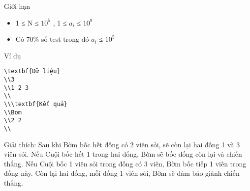 Giới hạn
\begin{itemize}
	\item     1 ≤ N ≤ $10^{5}$    , 1 ≤ $a_{i}$    ≤ $10^{9}$
	\item     Có 70\% số test trong đó $a_{i}$    ≤ $10^{5}$
\end{itemize}
Ví dụ
\begin{verbatim}
\textbf{Dữ liệu}
\\3
\\1 2 3 
\\
\\\textbf{Kết quả}
\\Bom
\\2 2
\\\end{verbatim}

   Giải thích: Sau khi Bờm bốc hết đống có 2 viên sỏi, sẽ còn lại hai đống 1 và 3 viên sỏi. Nếu Cuội bốc hết 1 trong hai đống, Bờm sẽ bốc đống còn lại và chiến thắng. Nếu Cuội bốc 1 viên sỏi trong đống có 3 viên, Bờm bốc tiếp 1 viên trong đống này. Còn lại hai đống, mỗi đống 1 viên sỏi, Bờm sẽ đảm bảo giành chiến thắng.